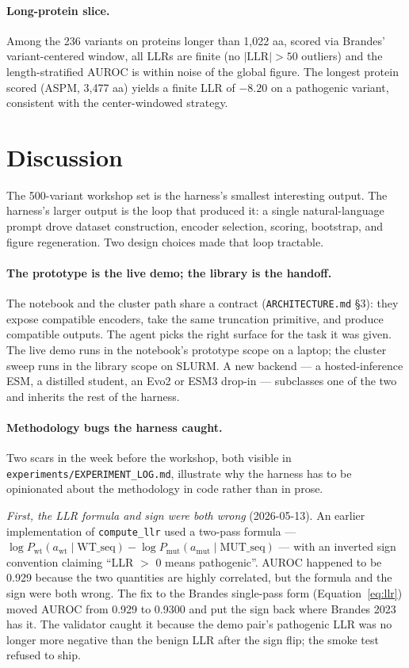 \documentclass{article}
\begin{document}
\paragraph{Long-protein slice.} Among the 236 variants on proteins
longer than 1{,}022 aa, scored via Brandes' variant-centered window,
all LLRs are finite (no \(|\mathrm{LLR}| > 50\) outliers) and the
length-stratified AUROC is within noise of the global figure. The
longest protein scored (ASPM, 3{,}477 aa) yields a finite LLR of
\(-8.20\) on a pathogenic variant, consistent with the
center-windowed strategy.

\section{Discussion}
\label{sec:discussion}

The 500-variant workshop set is the harness's smallest interesting
output. The harness's larger output is the loop that produced it: a
single natural-language prompt drove dataset construction, encoder
selection, scoring, bootstrap, and figure regeneration. Two design
choices made that loop tractable.

\paragraph{The prototype is the live demo; the library is the handoff.}
The notebook and the cluster path share a contract
(\texttt{ARCHITECTURE.md} \S3): they expose compatible encoders, take
the same truncation primitive, and produce compatible outputs. The
agent picks the right surface for the task it was given. The live demo
runs in the notebook's prototype scope on a laptop; the cluster sweep
runs in the library scope on SLURM. A new backend --- a hosted-inference
ESM, a distilled student, an Evo2 \citep{nguyen2024evo2} or ESM3
\citep{lin2023esm} drop-in --- subclasses one of the two and inherits
the rest of the harness.

\paragraph{Methodology bugs the harness caught.} Two scars in the week
before the workshop, both visible in
\texttt{experiments/EXPERIMENT\_LOG.md}, illustrate why the harness has
to be opinionated about the methodology in code rather than in prose.

\emph{First, the LLR formula and sign were both wrong}
(2026-05-13). An earlier implementation of \texttt{compute\_llr} used a
two-pass formula --- \(\log P_{\mathrm{wt}}(a_{\mathrm{wt}} \mid
\mathrm{WT\_seq}) - \log P_{\mathrm{mut}}(a_{\mathrm{mut}} \mid
\mathrm{MUT\_seq})\) --- with an inverted sign convention claiming
\enquote{LLR \(>\) 0 means pathogenic}. AUROC happened to be 0.929
because the two quantities are highly correlated, but the formula and
the sign were both wrong. The fix to the Brandes single-pass form
(Equation~\ref{eq:llr}) moved AUROC from 0.929 to 0.9300 and put the
sign back where Brandes 2023 has it. The validator caught it because the
demo pair's pathogenic LLR was no longer more negative than the benign
LLR after the sign flip; the smoke test refused to ship.
\end{document}
